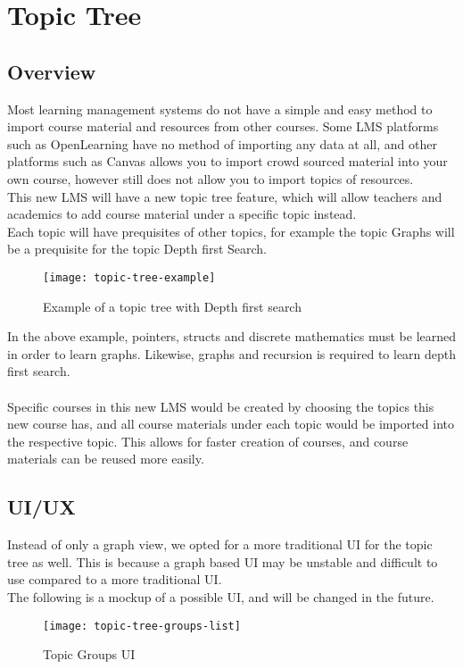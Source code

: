 \section{Topic Tree}
\subsection{Overview}
Most learning management systems do not have a simple and easy method to import course material and resources from other courses. Some LMS platforms such as OpenLearning have no method of importing any data at all, and other platforms such as Canvas allows you to import crowd sourced material into your own course, however still does not allow you to import topics of resources. \\

This new LMS will have a new topic tree feature, which will allow teachers and academics to add course material under a specific topic instead.\\
Each topic will have prequisites of other topics, for example the topic Graphs will be a prequisite for the topic Depth first Search.\\

\begin{figure}[h!]
    \centering
    \texttt{[image: topic-tree-example]}
    \caption{Example of a topic tree with Depth first search}
\end{figure}

In the above example, pointers, structs and discrete mathematics must be learned in order to learn graphs. Likewise, graphs and recursion is required to learn depth first search.\\
\\
Specific courses in this new LMS would be created by choosing the topics this new course has, and all course materials under each topic would be imported into the respective topic. This allows for faster creation of courses, and course materials can be reused more easily.\\

\subsection{UI/UX}
Instead of only a graph view, we opted for a more traditional UI for the topic tree as well. This is because a graph based UI may be unstable and difficult to use compared to a more traditional UI.\\

The following is a mockup of a possible UI, and will be changed in the future.\\
\begin{figure}[h!]
    \centering
    \texttt{[image: topic-tree-groups-list]}
    \caption{Topic Groups UI}
\end{figure}

